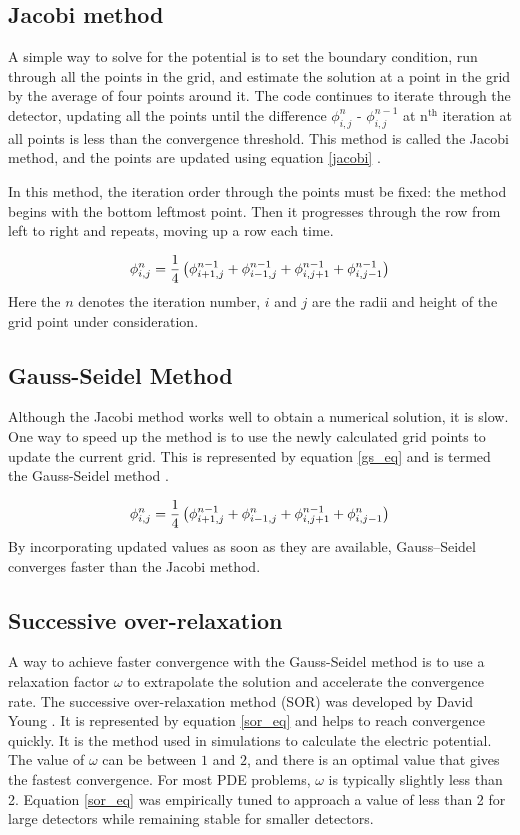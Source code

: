\subsection*{Jacobi method}
A simple way to solve for the potential is to set the boundary condition, run through all the points in the grid, and estimate the solution at a point in the grid by the average of four points around it. The code continues to iterate through the detector, updating all the points until the difference $\phi_{i,j}^{n}$ - $\phi_{i,j}^{n-1}$ at n$^{\text{th}}$ iteration at all points is less than the convergence threshold. This method is called the Jacobi method, and the points are updated using equation \ref{jacobi} \cite{Varga2000}. 

In this method, the iteration order through the points must be fixed: the method begins with the bottom leftmost point. Then it progresses through the row from left to right and repeats, moving up a row each time.


\begin{equation}{\label{jacobi}}
 \phi_{i,j}^{n} = \frac{1}{4}  \left(\phi^{n-1}_{i+1,j} + \phi^{n-1}_{i-1,j} + \phi^{n-1}_{i,j+1} + \phi^{n-1}_{i,j-1} \right)
\end{equation}
Here the $n$ denotes the iteration number, $i$ and $j$ are the radii and height of the grid point under consideration. 

\subsection*{Gauss-Seidel Method}
Although the Jacobi method works well to obtain a numerical solution, it is slow. One way to speed up the method is to use the newly calculated grid points to update the current grid. This is represented by equation \ref{gs_eq} and is termed the Gauss-Seidel method \cite{Varga2000}.

\begin{equation}{\label{gs_eq}}
 \phi_{i,j}^{n} = \frac{1}{4}  \left(\phi^{n-1}_{i+1,j} + \phi^n_{i-1,j} + \phi^{n-1}_{i,j+1} + \phi^n_{i,j-1} \right)
\end{equation}
By incorporating updated values as soon as they are available, Gauss--Seidel converges faster than the Jacobi method.

\subsection*{Successive over-relaxation}
A way to achieve faster convergence with the Gauss-Seidel method is to use a relaxation factor $\omega$ to extrapolate the solution and accelerate the convergence rate. The successive over-relaxation method (SOR) was developed by David Young \cite{Young1950}. It is represented by equation \ref{sor_eq} and helps to reach convergence quickly. It is the method used in {\siggen} simulations to calculate the electric potential. The value of $\omega$ can be between $1$ and $2$, and there is an optimal value that gives the fastest convergence. For most PDE problems, $\omega$ is typically slightly less than 2. Equation \ref{sor_eq} was empirically tuned to approach a value of less than 2 for large detectors while remaining stable for smaller detectors.

